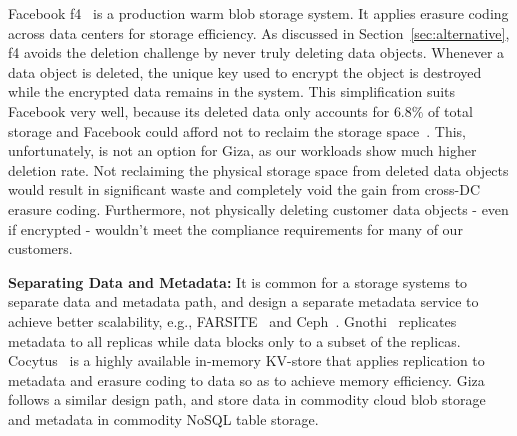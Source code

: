 Facebook f4~\cite{f4:osdi14} is a production warm blob storage system.
It applies erasure coding across data centers for storage efficiency.
As discussed in Section~\ref{sec:alternative}, f4 avoids the
deletion challenge by never truly deleting data objects. 
Whenever a data object is deleted, the unique key used to encrypt the object is destroyed
while the encrypted data remains in the system.
This simplification suits Facebook very well, because its deleted
data only accounts for $6.8\%$ of total storage and Facebook could afford not to
reclaim the storage space~\cite{f4:osdi14}. This, unfortunately, is not an
option for Giza, as our workloads show much higher deletion rate. Not reclaiming
the physical storage space from deleted data objects would result in significant
waste and completely void the gain from cross-DC erasure coding. Furthermore,
not physically deleting customer data objects - even if encrypted - wouldn't
meet the compliance requirements for many of our customers.


{\bf Separating Data and Metadata:}
It is common for a storage systems to separate data and metadata path, and
design a separate metadata service to achieve better scalability, e.g.,
FARSITE~\cite{adya02farsite} and Ceph~\cite{weil06ceph}.
Gnothi~\cite{wang12gnothi} replicates metadata to all replicas while data blocks
only to a subset of the replicas. Cocytus~\cite{zhang16efficient} is a highly
available in-memory KV-store that applies replication to metadata and erasure
coding to data so as to achieve memory efficiency. Giza follows a similar design
path, and store data in commodity cloud blob storage and metadata in commodity
NoSQL table storage.

